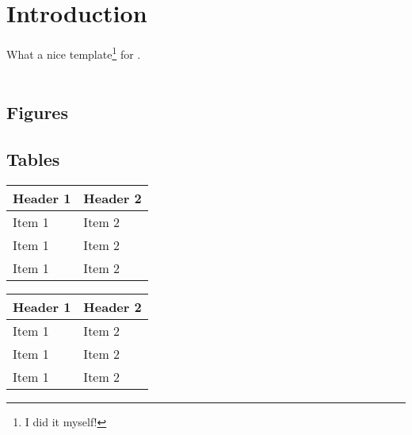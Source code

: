 \section*{Introduction}

What a nice template\footnote{I did it myself!} for \citep{Rougier:2017}.\\

\lipsum*[1]\\


\subsection*{Figures}

\begin{figure}[htbp]
    \label{fig:1}
\end{figure}

\subsection*{Tables}
\begin{table}[htbp]
\begin{minipage}{.45\textwidth}
  \begin{tabularx}{\textwidth}{|XX|}
      \hline
      \bfseries Header 1 & \bfseries Header 2\\
      \hline
      Item 1 & Item 2\\
      Item 1 & Item 2\\
      Item 1 & Item 2\\
      \hline
    \end{tabularx}
    \label{tab:1}
\end{minipage}
\hfill
\begin{minipage}{.45\textwidth}
  \begin{tabularx}{\textwidth}{|XX|}
      \hline
      \bfseries Header 1 & \bfseries Header 2\\
      \hline
      Item 1 & Item 2\\
      Item 1 & Item 2\\
      Item 1 & Item 2\\
      \hline
    \end{tabularx}
    \label{tab:2}
\end{minipage}
\end{table}

